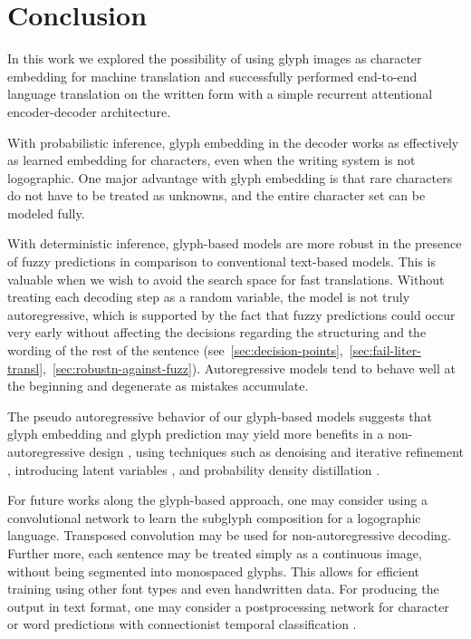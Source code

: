 \documentclass[11pt,twocolumn]{article}
\begin{document}
\section{Conclusion}\label{sec:conclusion}

In this work we explored the possibility of using glyph images as character embedding for machine translation
and successfully performed end-to-end language translation on the written form
with a simple recurrent attentional encoder-decoder architecture.

With probabilistic inference,
glyph embedding in the decoder works as effectively as learned embedding for characters,
even when the writing system is not logographic.
One major advantage with glyph embedding is that rare characters do not have to be treated as unknowns,
and the entire character set can be modeled fully.

With deterministic inference,
glyph-based models are more robust in the presence of fuzzy predictions
in comparison to conventional text-based models.
This is valuable when we wish to avoid the search space for fast translations.
Without treating each decoding step as a random variable,
the model is not truly autoregressive,
which is supported by the fact that fuzzy predictions could occur very early
without affecting the decisions regarding the structuring and the wording of the rest of the sentence
(see~\ref{sec:decision-points},~\ref{sec:fail-liter-transl},~\ref{sec:robustn-against-fuzz}).
Autoregressive models tend to behave well at the beginning and degenerate as mistakes accumulate.

The pseudo autoregressive behavior of our glyph-based models suggests that glyph embedding and glyph prediction
may yield more benefits in a non-autoregressive design \parencite{gu2017non},
using techniques such as denoising and iterative refinement \parencite{lee2018deterministic},
introducing latent variables \parencite{kaiser2018fast},
and probability density distillation \parencite{oord2017parallel}.

For future works along the glyph-based approach,
one may consider using a convolutional network
to learn the subglyph composition for a logographic language.
Transposed convolution may be used for non-autoregressive decoding.
Further more, each sentence may be treated simply as a continuous image,
without being segmented into monospaced glyphs.
This allows for efficient training using other font types and even handwritten data.
For producing the output in text format,
one may consider a postprocessing network for character or word predictions
with connectionist temporal classification \parencite{graves2006connectionist,libovicky2018end}.
\end{document}
